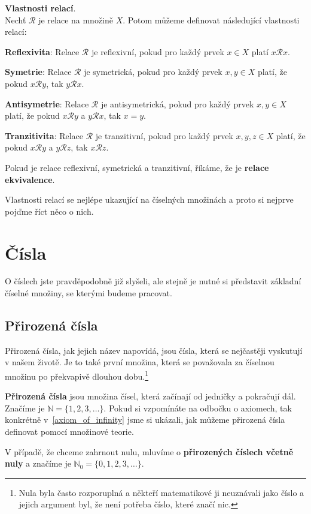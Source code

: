 \begin{definitionbox}
  \textbf{Vlastnosti relací}. \\
    Nechť $\mathcal R$ je relace na množině $X$. Potom můžeme definovat následující vlastnosti relací: \vspace{5mm}

    \textbf{Reflexivita}: Relace $\mathcal R$ je reflexivní, pokud pro každý prvek $x\in X$ platí $x\mathcal Rx$.\ \vspace{1mm}

    \textbf{Symetrie}: Relace $\mathcal R$ je symetrická, pokud pro každý prvek $x, y\in X$ platí, že pokud $x\mathcal Ry$, tak $y\mathcal Rx$.\ \vspace{1mm}

    \textbf{Antisymetrie}: Relace $\mathcal R$ je antisymetrická, pokud pro každý prvek $x, y\in X$ platí, že pokud $x\mathcal Ry$ a $y\mathcal Rx$, tak $x = y$.\ \vspace{1mm}

    \textbf{Tranzitivita}: Relace $\mathcal R$ je tranzitivní, pokud pro každý prvek $x, y, z\in X$ platí, že pokud $x\mathcal Ry$ a $y\mathcal Rz$, tak $x\mathcal Rz$.\ \vspace{1mm}

  Pokud je relace reflexivní, symetrická a tranzitivní, říkáme, že je \textbf{relace ekvivalence}.
\end{definitionbox}

Vlastnosti relací se nejlépe ukazující na číselných množinách a proto si nejprve pojďme říct něco o nich.

\section{Čísla}
O číslech jste pravděpodobně již slyšeli, ale stejně je nutné si představit základní číselné množiny, se kterými budeme pracovat. 

\subsection{Přirozená čísla}
Přirozená čísla, jak jejich název napovídá, jsou čísla, která se nejčastěji vyskutují v našem životě. Je to také první množina, která se považovala za číselnou množinu po překvapivě dlouhou dobu.\footnote{Nula byla často rozporuplná a někteří matematikové ji neuznávali jako číslo a jejich argument byl, že není potřeba číslo, které značí nic.} 
\begin{definitionbox}
  \textbf{Přirozená čísla} jsou množina čísel, která začínají od jedničky a pokračují dál. Značíme je $\mathbb{N} = \{1, 2, 3, \ldots\}$. Pokud si vzpomínáte na odbočku o axiomech, tak konkrétně v~\ref{axiom_of_infinity} jsme si ukázali, jak můžeme přirozená čísla definovat pomocí množinové teorie.

  V případě, že chceme zahrnout nulu, mluvíme o \textbf{přirozených číslech včetně nuly} a značíme je $\mathbb{N}_0 = \{0, 1, 2, 3, \ldots\}$.
\end{definitionbox}

